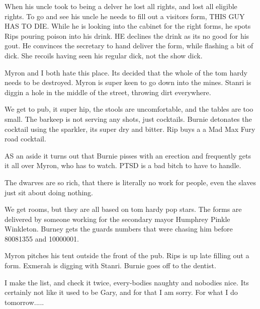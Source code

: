 \begin{multicols}{2}
When his uncle took to being a delver he lost all rights, and lost all eligible rights. To go and see his uncle he needs to fill out a visitors form, THIS GUY HAS TO DIE. While he is looking into the cabinet for the right forms, he spots Rips pouring poison into his drink. HE declines the drink as its no good for his gout. He convinces the secretary to hand deliver the form, while flashing a bit of dick. She recoils having seen his regular dick, not the show dick.\medskip

Myron and I both hate this place. Its decided that the whole of the tom hardy needs to be destroyed. Myron is super keen to go down into the mines. Stanri is diggin a hole in the middle of the street, throwing dirt everywhere.\medskip

We get to pub, it super hip, the stools are uncomfortable, and the tables are too small. The barkeep is not serving any shots, just cocktails. Burnie detonates the cocktail using the sparkler, its super dry and bitter. Rip buys a a Mad Max Fury road cocktail.\medskip

AS an aside it turns out that Burnie pisses with an erection and frequently gets it all over Myron, who has to watch. PTSD is a bad bitch to have to handle.\medskip

The dwarves are so rich, that there is literally no work for people, even the slaves just sit about doing nothing.\medskip

We get rooms, but they are all based on tom hardy pop stars. The forms are delivered by someone working for the secondary mayor Humphrey Pinkle Winkleton. Burney gets the guards numbers that were chasing him before 80081355 and 10000001.\medskip

Myron pitches his tent outside the front of the pub. Rips is up late filling out a form. Exmerah is digging with Stanri. Burnie goes off to the dentist.\medskip

I make the list, and check it twice, every-bodies naughty and nobodies nice. Its certainly not like it used to be Gary, and for that I am sorry. For what I do tomorrow.....\medskip


\end{multicols}

\vspace*{5mm}

